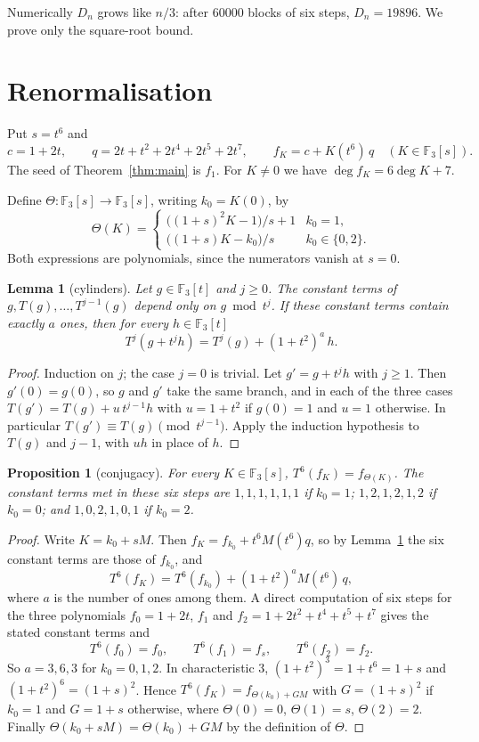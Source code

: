 \documentclass[11pt,a4paper]{article}
\newtheorem{lemma}{Lemma}
\newtheorem{proposition}{Proposition}
\theoremstyle{remark}
\newcommand{\F}{\mathbb F}
\begin{document}
Numerically $D_n$ grows like $n/3$: after $60000$ blocks of six steps, $D_n=19896$. We prove
only the square-root bound.

\section{Renormalisation}

Put $s=t^6$ and
\[
 c=1+2t,\qquad q=2t+t^2+2t^4+2t^5+2t^7,\qquad f_K=c+K(t^6)\,q\quad(K\in\F_3[s]).
\]
The seed of Theorem~\ref{thm:main} is $f_1$. For $K\ne0$ we have $\deg f_K=6\deg K+7$.

Define $\Theta\colon\F_3[s]\to\F_3[s]$, writing $k_0=K(0)$, by
\[
\Theta(K)=\begin{cases}
 \bigl((1+s)^2K-1\bigr)/s+1 & k_0=1,\\[2pt]
 \bigl((1+s)K-k_0\bigr)/s & k_0\in\{0,2\}.
\end{cases}
\]
Both expressions are polynomials, since the numerators vanish at $s=0$.

\begin{lemma}[cylinders]\label{lem:cyl}
Let $g\in\F_3[t]$ and $j\ge0$. The constant terms of $g,T(g),\dots,T^{j-1}(g)$ depend only on
$g\bmod t^{j}$. If these constant terms contain exactly $a$ ones, then for every $h\in\F_3[t]$
\[
 T^{j}(g+t^{j}h)=T^{j}(g)+(1+t^2)^{a}\,h .
\]
\end{lemma}
\begin{proof}
Induction on $j$; the case $j=0$ is trivial. Let $g'=g+t^jh$ with $j\ge1$. Then $g'(0)=g(0)$, so
$g$ and $g'$ take the same branch, and in each of the three cases
$T(g')=T(g)+u\,t^{j-1}h$ with $u=1+t^2$ if $g(0)=1$ and $u=1$ otherwise. In particular
$T(g')\equiv T(g)\pmod{t^{j-1}}$. Apply the induction hypothesis to $T(g)$ and $j-1$, with $uh$ in
place of $h$.
\end{proof}

\begin{proposition}[conjugacy]\label{prop:conj}
For every $K\in\F_3[s]$, $T^6(f_K)=f_{\Theta(K)}$. The constant terms met in these six steps are
$1,1,1,1,1,1$ if $k_0=1$; $1,2,1,2,1,2$ if $k_0=0$; and $1,0,2,1,0,1$ if $k_0=2$.
\end{proposition}
\begin{proof}
Write $K=k_0+sM$. Then $f_K=f_{k_0}+t^6M(t^6)q$, so by Lemma~\ref{lem:cyl} the six constant terms
are those of $f_{k_0}$, and
\[
 T^6(f_K)=T^6(f_{k_0})+(1+t^2)^{a}M(t^6)\,q ,
\]
where $a$ is the number of ones among them. A direct computation of six steps for the three
polynomials $f_0=1+2t$, $f_1$ and $f_2=1+2t^2+t^4+t^5+t^7$ gives the stated constant terms and
\[
 T^6(f_0)=f_0,\qquad T^6(f_1)=f_s,\qquad T^6(f_2)=f_2 .
\]
So $a=3,6,3$ for $k_0=0,1,2$. In characteristic $3$, $(1+t^2)^3=1+t^6=1+s$ and
$(1+t^2)^6=(1+s)^2$. Hence $T^6(f_K)=f_{\Theta(k_0)+GM}$ with $G=(1+s)^2$ if $k_0=1$ and $G=1+s$
otherwise, where $\Theta(0)=0$, $\Theta(1)=s$, $\Theta(2)=2$. Finally
$\Theta(k_0+sM)=\Theta(k_0)+GM$ by the definition of $\Theta$.
\end{proof}
\end{document}
